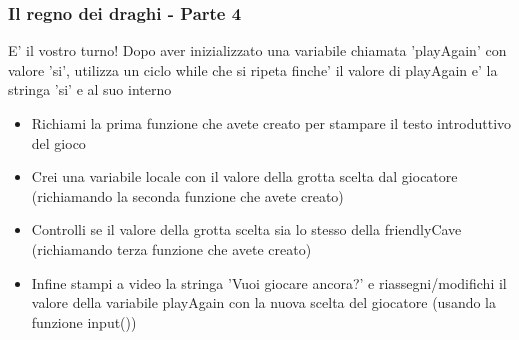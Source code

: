 \begin{frame}[fragile]
\frametitle{Il regno dei draghi - Parte 4}

\begin{block}{E' il vostro turno!}
Dopo aver inizializzato una variabile chiamata 'playAgain' con valore 'si', utilizza un ciclo while che si ripeta finche' il valore di playAgain e' la stringa 'si' e al suo interno
    \begin{itemize}
        \item Richiami la prima funzione che avete creato per stampare il testo introduttivo del gioco
        \item Crei una variabile locale con il valore della grotta scelta dal giocatore (richiamando la seconda funzione che avete creato)
        \item Controlli se il valore della grotta scelta sia lo stesso della friendlyCave (richiamando terza funzione che avete creato)
        \item Infine stampi a video la stringa 'Vuoi giocare ancora?' e riassegni/modifichi il valore della variabile playAgain con la nuova scelta del giocatore (usando la funzione input())
    \end{itemize}
\end{block}
\end{frame}